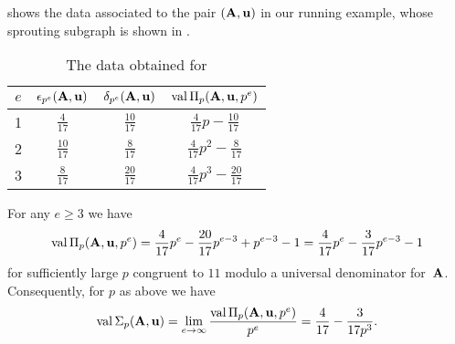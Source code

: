 \documentclass{amsart}
\begin{document}
\begin{example}
   \label{ex: ft.5}
    shows the data associated to the pair $(\mathbf{A},\mathbf{u})$ in our running example, whose sprouting subgraph is shown in .
   \begin{table}
      \begin{center}
         \begingroup
         \setlength{\tabcolsep}{8pt} %
         \renewcommand{\arraystretch}{1.4} %
         \begin{tabular}{cccc}
           \toprule
           $e$ & $\epsilon_{p^e}(\mathbf{A},\mathbf{u})$ & $\delta_{p^e}(\mathbf{A},\mathbf{u})$ & $\operatorname{val}\Pi_p(\mathbf{A},\mathbf{u},p^e)$ \\
           \midrule
           1 & $\frac{4}{17}$ & $\frac{10}{17}$ & $\frac{4}{17}p - \frac{10}{17}$\\
           2 & $\frac{10}{17}$ & $\frac{8}{17}$ & $\frac{4}{17}p^2 - \frac{8}{17}$ \\
           3 & $\frac{8}{17}$ & $\frac{20}{17}$ & $\frac{4}{17}p^3 - \frac{20}{17}$\\
           \bottomrule
         \end{tabular}
         \endgroup
      \end{center}
      \caption{The data obtained for }
      \label{table: running example data}
   \end{table}
   For any $e \ge 3$ we have
   \[
      \operatorname{val}\Pi_p(\mathbf{A},\mathbf{u},p^e) = \frac{4}{17}p^e - \frac{20}{17}p^{e-3} + p^{e-3} - 1
       = \frac{4}{17}p^e - \frac{3}{17}p^{e-3}  - 1
    \]
    for sufficiently large $p$ congruent to $11$ modulo a universal denominator for~$\mathbf{A}$.
    Consequently, for $p$ as above we have
    \[\operatorname{val} \Sigma_p(\mathbf{A},\mathbf{u}) = \lim_{e\to \infty}  \frac{\operatorname{val}\Pi_p(\mathbf{A},\mathbf{u},p^e)}{p^e} = \frac{4}{17} - \frac{3}{17p^3}.\]
\end{example}
\end{document}
